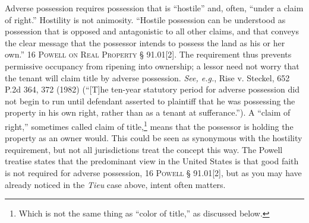 

Adverse possession requires possession that is ``hostile'' and, often, ``under a
claim of right.'' Hostility is not animosity. ``Hostile possession can be
understood as possession that is opposed and antagonistic to all other claims,
and that conveys the clear message that the possessor intends to possess the
land as his or her own.'' 16 \textsc{Powell on Real Property} {\S} 91.01[2].
The requirement thus prevents permissive occupancy from ripening into
ownership; a lessor need not worry that the tenant will claim title by adverse
possession. \textit{See, e.g.}, Rise v. Steckel, 652 P.2d 364, 372 (1982)
(``[T]he ten-year statutory period for adverse possession did not begin to run
until defendant asserted to plaintiff that he was possessing the property in
his own right, rather than as a tenant at sufferance.''). A ``claim of right,''
sometimes called claim of title,\footnote{ Which is not the same thing as
``color of title,'' as discussed below.} means that the possessor is holding
the property as an owner would. This could be seen as synonymous with the
hostility requirement, but not all jurisdictions treat the concept this way.
The Powell treatise states that the predominant view in the United States is
that good faith is not required for adverse possession, 16 \textsc{Powell} {\S}
91.01[2], but as you may have already noticed in the \textit{Tieu} case above,
intent often matters.

